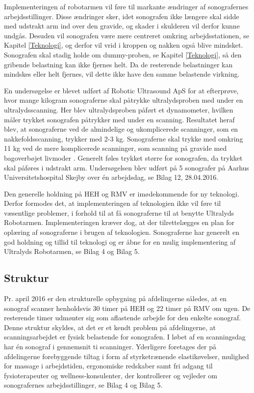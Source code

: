 Implementeringen af robotarmen vil føre til markante ændringer af sonografernes arbejdsstillinger. Disse ændringer sker, idet sonografen ikke længere skal sidde med udstrakt arm ind over den gravide, og skader i skulderen vil derfor kunne undgås. Desuden vil sonografen være mere centreret omkring arbejdsstationen, se Kapitel \ref{Teknologi}, og derfor vil vrid i kroppen og nakken også blive mindsket. Sonografen skal stadig holde om dummy-proben, se Kapitel \ref{Teknologi}, så den gribende belastning kan ikke fjernes helt. Da de resterende belastninger kan mindskes eller helt fjernes, vil dette ikke have den samme belastende virkning. 

En undersøgelse er blevet udført af Robotic Ultrasound ApS for at efterprøve, hvor mange kilogram sonograferne skal påtrykke ultralydsproben med under en ultralydsscanning. Her blev ultralydsproben påført et dynamometer, hvilken måler trykket sonografen påtrykker med under en scanning. Resultatet heraf blev, at sonograferne ved de almindelige og ukomplicerede scanninger, som en nakkefoldsscanning, trykker med 2-3 kg. Sonograferne skal trykke med omkring 11 kg ved de mere komplicerede scanninger, som scanning på gravide med bagoverbøjet livmoder \cite{livmoder}. Generelt føles trykket større for sonografen, da trykket skal påføres i udstrakt arm. Undersøgelsen blev udført på 5 sonografer på Aarhus Universitetshospital Skejby over én arbejdsdag, se Bilag 12, 28.04.2016.

Den generelle holdning på HEH og RMV er imødekommende for ny teknologi. Derfor formodes det, at implementeringen af teknologien ikke vil føre til væsentlige problemer, i forhold til at få sonograferne til at benytte Ultralyds Robotarmen. Implementeringen kræver dog, at der tilrettelægges en plan for oplæring af sonograferne i brugen af teknologien. Sonograferne har generelt en god holdning og tillid til teknologi og er åbne for en mulig implementering af Ultralyds Robotarmen, se Bilag 4 og Bilag 5.

\subsection{Struktur}
Pr. april 2016 er den strukturelle opbygning på afdelingerne således, at en sonograf scanner henholdsvis 30 timer på HEH og 22 timer på RMV om ugen. De resterende timer udmønter sig som aflastende arbejde for den enkelte sonograf. Denne struktur skyldes, at det er et kendt problem på afdelingerne, at scanningsarbejdet er fysisk belastende for sonografen. I løbet af en scanningsdag har én sonograf i gennemsnit ti scanninger. Yderligere foretages der på afdelingerne forebyggende tiltag i form af styrketrænende elastikøvelser, mulighed for massage i arbejdstiden, ergonomiske redskaber samt fri adgang til fysioterapeuter og wellness-konsulenter, der kontrollerer og vejleder om sonografernes arbejdsstillinger, se Bilag 4 og Bilag 5.

